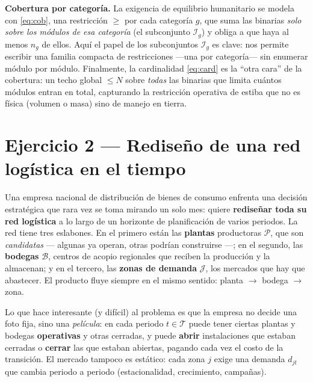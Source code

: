 \documentclass[11pt]{article}
\begin{document}
\medskip
\noindent\textbf{Cobertura por categoría.} La exigencia de equilibrio humanitario se modela con \eqref{eq:cob}, una restricción $\ge$ por cada categoría $g$, que suma las binarias \emph{solo sobre los módulos de esa categoría} (el subconjunto $\mathcal{I}_g$) y obliga a que haya al menos $n_g$ de ellos. Aquí el papel de los subconjuntos $\mathcal{I}_g$ es clave: nos permite escribir una familia compacta de restricciones —una por categoría— sin enumerar módulo por módulo. Finalmente, la cardinalidad \eqref{eq:card} es la ``otra cara'' de la cobertura: un techo global $\le N$ sobre \emph{todas} las binarias que limita cuántos módulos entran en total, capturando la restricción operativa de estiba que no es física (volumen o masa) sino de manejo en tierra.

\fi

\newpage

\section{Ejercicio 2 --- Rediseño de una red logística en el tiempo}

Una empresa nacional de distribución de bienes de consumo enfrenta una decisión estratégica que rara vez se toma mirando un solo mes: quiere \textbf{rediseñar toda su red logística} a lo largo de un horizonte de planificación de varios periodos. La red tiene tres eslabones. En el primero están las \textbf{plantas} productoras $\mathcal{P}$, que son \emph{candidatas} --- algunas ya operan, otras podrían construirse ---; en el segundo, las \textbf{bodegas} $\mathcal{B}$, centros de acopio regionales que reciben la producción y la almacenan; y en el tercero, las \textbf{zonas de demanda} $\mathcal{J}$, los mercados que hay que abastecer. El producto fluye siempre en el mismo sentido: planta $\to$ bodega $\to$ zona.

Lo que hace interesante (y difícil) al problema es que la empresa no decide una foto fija, sino una \emph{película}: en cada periodo $t\in\mathcal{T}$ puede tener ciertas plantas y bodegas \textbf{operativas} y otras cerradas, y puede \textbf{abrir} instalaciones que estaban cerradas o \textbf{cerrar} las que estaban abiertas, pagando cada vez el costo de la transición. El mercado tampoco es estático: cada zona $j$ exige una demanda $d_{jt}$ que cambia periodo a periodo (estacionalidad, crecimiento, campañas).
\end{document}
